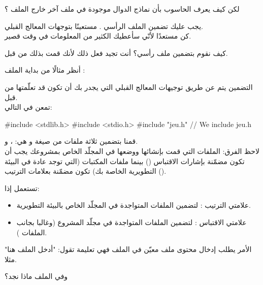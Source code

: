 \begin{question}
  لكن كيف يعرف الحاسوب بأن نماذج الدوال موجودة في ملف آخر خارج الملف
؟
\end{question}

يجب عليك تضمين الملف الرأسي
.
مستعينًا بتوجهات المعالج القبلي.\\
كن مستعدًا لأنّي سأعطيك الكثير من المعلومات في وقت قصير.

كيف نقوم بتضمين ملف رأسي؟ أنت تجيد فعل ذلك لأنك قمت بذلك من قبل.

أنظر مثالًا من بداية الملف
:

\begin{Csource}
#include <stdlib.h>
#include <stdio.h>
#include "jeu.h"
void play(SDL_Surface* screen)
{
// ...
\end{Csource}

التضمين يتم عن طريق توجيهات المعالج القبلي
التي يجدر بك أن تكون قد تعلّمتها من قبل.\\
تمعن في التالي:

\begin{Csource}
#include <stdlib.h>
#include <stdio.h>
#include "jeu.h" // We include jeu.h
\end{Csource}

قمنا بتضمين ثلاثة ملفات من صيغة
و هي:
،  و.\\
لاحظ الفرق: الملفات التي قمت بإنشائها ووضعها في المجلّد الخاص بمشروعك يجب أن تكون مضمّنة بإشارات الاقتباس
()
بينما ملفات المكتبات (التي توجد عادة في البيئة التطويرية الخاصة بك) تكون مضمّنة بعلامات الترتيب
().

تستعمل إذا:

\begin{itemize}
  \item علامتي الترتيب
\InlineCode{< >}:
 لتضمين الملفات المتواجدة في المجلّد
الخاص بالبيئة التطويرية.
  \item علامتي الاقتباس
:
 لتضمين  الملفات المتواجدة في مجلّد المشروع (وغالبا بجانب الملفات
).
\end{itemize}

الأمر
يطلب إدخال محتوى ملف معيّن في الملف
فهي تعليمة تقول: "أدخل الملف
هنا" مثلا.

\begin{question}
  وفي الملف
ماذا نجد؟
\end{question}

